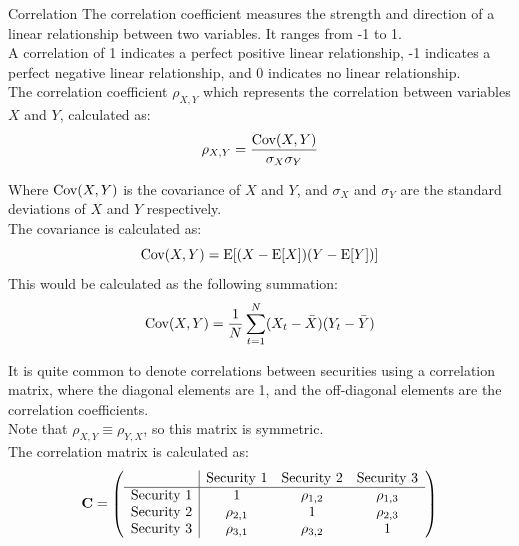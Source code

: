 \begin{sidenotebox}{Correlation}
    The correlation coefficient measures the strength and direction of a linear relationship between two variables. It ranges from -1 to 1.\\

    A correlation of 1 indicates a perfect positive linear relationship, -1 indicates a perfect negative linear relationship, and 0 indicates no linear relationship.\\

    The correlation coefficient $\rho_{X,Y}$ which represents the correlation between variables $X$ and $Y$, calculated as:
    \begin{equation}
        \rho_{X,Y} = \frac{\text{Cov}(X,Y)}{\sigma_X \sigma_Y}
    \end{equation}

    Where $\text{Cov}(X,Y)$ is the covariance of $X$ and $Y$, and $\sigma_X$ and $\sigma_Y$ are the standard deviations of $X$ and $Y$ respectively.\\

    The covariance is calculated as:
    \begin{equation}
        \text{Cov}(X,Y) = \text{E}[(X - \text{E}[X])(Y - \text{E}[Y])]
    \end{equation}
    This would be calculated as the following summation:
    \begin{equation}
        \text{Cov}(X,Y) = \frac{1}{N} \sum_{t=1}^{N} (X_t - \bar{X})(Y_t - \bar{Y})
    \end{equation}

    

    It is quite common to denote correlations between securities using a correlation matrix, where the diagonal elements are 1, and the off-diagonal elements are the correlation coefficients.\\

    Note that $\rho_{X,Y} \equiv \rho_{Y,X}$, so this matrix is symmetric.\\
    
    The correlation matrix is calculated as:
    \begin{equation}
        \mathbf{C} = \left( \begin{array}{c|ccc}
        & \text{Security 1} & \text{Security 2} & \text{Security 3} \\ \hline
        \text{Security 1} & 1 & \rho_{1,2} & \rho_{1,3} \\
        \text{Security 2} & \rho_{2,1} & 1 & \rho_{2,3} \\
        \text{Security 3} & \rho_{3,1} & \rho_{3,2} & 1 
        \end{array} \right)
    \end{equation}


\end{sidenotebox}
